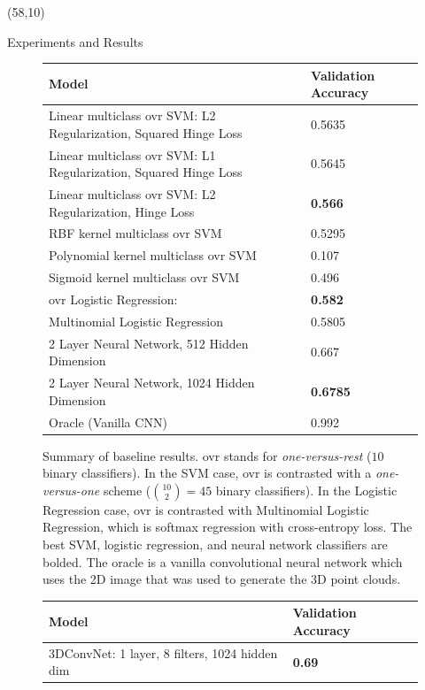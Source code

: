 \documentclass[final]{beamer}
\begin{document}
\begin{frame}{}
\begin{textblock}{25}(58,10)
\begin{block}{Experiments and Results}
\begin{figure}
\begin{center}
\tiny
\begin{tabular}{|l|l|}
\hline
Model & Validation Accuracy\\
\hline
Linear multiclass ovr SVM: L2 Regularization, Squared Hinge Loss & 0.5635\\ 
\hline
Linear multiclass ovr SVM: L1 Regularization, Squared Hinge Loss & 0.5645\\  
\hline
Linear multiclass ovr SVM: L2 Regularization, Hinge Loss & \textbf{0.566}\\
\hline
RBF kernel multiclass ovr SVM & 0.5295\\
\hline
Polynomial kernel multiclass ovr SVM & 0.107\\
\hline
Sigmoid kernel multiclass ovr SVM & 0.496\\
\hline
ovr Logistic Regression: & \textbf{0.582}\\
\hline 
Multinomial Logistic Regression & 0.5805\\
\hline
2 Layer Neural Network, 512 Hidden Dimension & 0.667\\
\hline
2 Layer Neural Network, 1024 Hidden Dimension & \textbf{0.6785}\\
\hline
Oracle (Vanilla CNN) & 0.992\\
\hline
\end{tabular}
\end{center}
\vspace{0.5em}
\caption{Summary of baseline results. ovr stands for \textit{one-versus-rest} ($10$ binary classifiers). In the SVM case, ovr is contrasted with a \textit{one-versus-one} scheme ($\binom{10}{2}=45$ binary classifiers). In the Logistic Regression case, ovr is contrasted with Multinomial Logistic Regression, which is softmax regression with cross-entropy loss. The best SVM, logistic regression, and neural network classifiers are bolded. The oracle is a vanilla convolutional neural network which uses the 2D image that was used to generate the 3D point clouds.}
\label{baselines}
\end{figure}
\tiny
\begin{figure}
\begin{center}
\begin{tabular}{|l|l|}
\hline
Model & Validation Accuracy\\
\hline
3DConvNet: 1 layer, 8 filters, 1024 hidden dim & \textbf{0.69}\\

\end{tabular}
\end{center}
\end{figure}
\end{block}
\end{textblock}
\end{frame}
\end{document}
